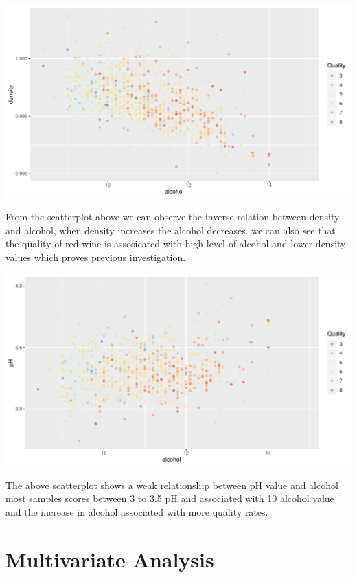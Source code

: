 \documentclass[]{article}
\begin{document}
\begin{center}\includegraphics{Figs/Multivariate_Plots-1} \end{center}

From the scatterplot above we can observe the inverse relation between
density and alcohol, when density increases the alcohol decreases. we
can also see that the quality of red wine is assosicated with high level
of alcohol and lower density values which proves previous investigation.

\begin{center}\includegraphics{Figs/unnamed-chunk-14-1} \end{center}

The above scatterplot shows a weak relationship between pH value and
alcohol most samples scores between 3 to 3.5 pH and associated with 10
alcohol value and the increase in alcohol associated with more quality
rates.

\hypertarget{multivariate-analysis}{%
\section{Multivariate Analysis}\label{multivariate-analysis}}
\end{document}
